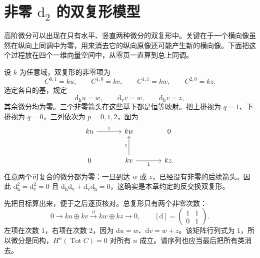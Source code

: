 
% 
% 
% 

\section{非零 \texorpdfstring{\(\mathrm{d}_2\)}{d₂} 的双复形模型}
\label{g2:sec:1006}

高阶微分可以出现在只有水平、竖直两种微分的双复形中。关键在于一个横向像虽然在纵向上同调中为零，用来消去它的纵向原像还可能产生新的横向像。下面把这个过程放在四个一维向量空间中，从零页一直算到总上同调。

\ProseParagraphBreak

设 \(k\) 为任意域，双复形的非零项为
\[
	C^{0,1}=ku,\qquad C^{1,0}=kv,\qquad C^{1,1}=kw,\qquad C^{2,0}=kz.
\]
选定各自的基，规定
\begin{equation}\label{g2:eq:nonzero-d2-model}
	\mathrm d_{\mathrm h}u=w,\qquad \mathrm d_{\mathrm v}v=w,\qquad \mathrm d_{\mathrm h}v=z,
\end{equation}
其余微分均为零。三个非零箭头在这些基下都是恒等映射。把上排视为 \(q=1\)、下排视为 \(q=0\)，三列依次为 \(p=0,1,2\)，图为
\[
	\begin{tikzcd}[column sep=large,row sep=large]
		ku \arrow[r,"1"] & kw & 0 \\
		0 & kv \arrow[u,"1"] \arrow[r,"1"'] & kz.
	\end{tikzcd}
\]
任意两个可复合的微分都为零：一旦到达 \(w\) 或 \(z\)，已经没有非零的后续箭头。因此 \(\mathrm d_{\mathrm h}^2=\mathrm d_{\mathrm v}^2=0\) 且 \(\mathrm d_{\mathrm h}\mathrm d_{\mathrm v}+\mathrm d_{\mathrm v}\mathrm d_{\mathrm h}=0\)，这确实是本章约定的反交换双复形。

\ProseParagraphBreak

先把目标算出来，便于之后逐页核对。总复形只有两个非零次数：
\begin{equation}\label{g2:eq:nonzero-d2-total-complex}
	0\longrightarrow ku\oplus kv\xrightarrow{\mathrm d}kw\oplus kz\longrightarrow0,
	\qquad [\mathrm d]=\begin{pmatrix}1&1\\0&1\end{pmatrix}.
\end{equation}
左项在次数 \(1\)，右项在次数 \(2\)，因为 \(\mathrm du=w\)、\(\mathrm dv=w+z\)。该矩阵行列式为 \(1\)，所以微分是同构，\(H^n(\operatorname{Tot}C)=0\) 对所有 \(n\) 成立。谱序列也应当最后把所有类消去。

